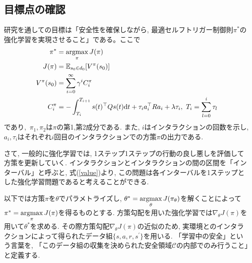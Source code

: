 \documentclass{jsarticle}
\newcommand{\argmax}{\mathop{\rm argmax}\limits}
\newcommand{\expect}{\mathbb{E}}
\begin{document}
\subsection{目標点の確認}
研究を通しての目標は「安全性を確保しながら, 最適セルフトリガー制御則$\pi^{*}$の強化学習を実現させること」である。ここで
\begin{align}
	\pi^{*} &= \argmax_{\pi}J(\pi) \\
	J(\pi) &= \expect_{s_0\in d_0}[V^{\pi}(s_0)] \\
	V^{\pi}(s_0) &= \sum_{i=0}^{\infty} \gamma^i C^{\pi}_i \label{value} \\
	C^{\pi}_i &= -\int_{T_i}^{T_{i+1}}s(t)^{\top}Qs(t)\textrm{d}t +\tau_ia_i^{\top}Ra_i + \lambda \tau_i, ~T_i = \sum_{l=0}^{i} \tau_l \label{reward}
\end{align}
であり,~$\pi_1, \pi_2$は$\pi$の第1,第2成分である. また, $i$はインタラクションの回数を示し, $a_i, \tau_i$はそれぞれ$i$回目のインタラクションでの方策$\pi$の出力である. \par
さて, 一般的に強化学習では, 1ステップ1ステップの行動の良し悪しを評価して方策を更新していく. 
インタラクションとインタラクションの間の区間を「インターバル」と呼ぶと, 式(\ref{value})より, この問題は各インターバルを1ステップとした強化学習問題であると考えることができる. \par
以下では方策$\pi$を$\theta$でパラメトライズし, $\theta^{*} = \argmax_{\theta}J(\pi_{\theta})$を解くことによって$\pi^{*} = \argmax_{\pi}J(\pi)$を得るものとする. 方策勾配を用いた強化学習では$\nabla_{\theta}J(\pi)$を用いて$\theta^{*}$を求める. その際方策勾配$\nabla_{\theta}J(\pi)$の近似のため, 実環境とのインタラクションによって得られたデータ組$\{s,a,r,s^{\prime}\}$を用いる. 「学習中の安全」という言葉を, 「このデータ組の収集を決められた安全領域$\mathcal{C}$の内部でのみ行うこと」と定義する.\par
\end{document}

